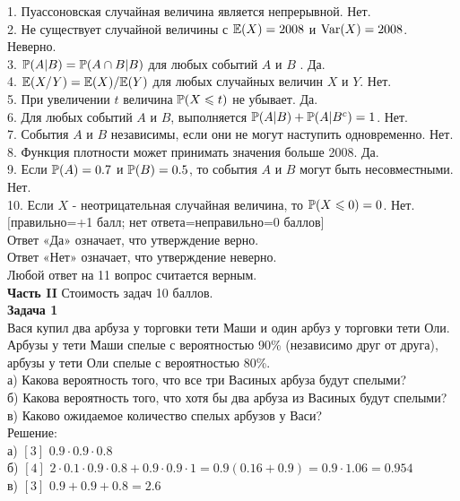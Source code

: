 \documentclass[12pt, a4paper]{article}\usepackage[]{graphicx}\usepackage[]{color}
\begin{document}
	1. Пуассоновская случайная величина является непрерывной. Нет. \\
	2. Не существует случайной величины с $\E(X)=2008$ и $\Var(X)=2008$. Неверно. \\
	3. $\P(A|B)=\P(A\cap B|B)$ для любых событий $A$ и $B$ . Да. \\
	4. $\E(X/Y)=\E(X)/\E(Y)$ для любых случайных величин $X$ и $Y$. Нет. \\
	5. При увеличении $t$ величина $\P(X\le t)$ не убывает. Да. \\
	6. Для любых событий $A$ и $B$, выполняется $\P(A|B)+\P(A|B^{c})=1$. Нет. \\
	7. События $A$ и $B$ независимы, если они не могут наступить одновременно. Нет. \\
	8. Функция плотности может принимать значения больше 2008. Да. \\
	9. Если $\P(A)=0.7$ и $\P(B)=0.5$, то события $A$ и $B$ могут быть несовместными. Нет. \\
	10. Если $X$ - неотрицательная случайная величина, то $\P(X\le 0)=0$. Нет. \\

	$[$правильно=+1 балл; нет ответа=неправильно=0 баллов$]$ \\
	Ответ «Да» означает, что утверждение верно. \\
	Ответ «Нет» означает, что утверждение неверно. \\
	Любой ответ на 11 вопрос считается верным. \\


	\textbf{Часть II} Стоимость задач 10 баллов. \\





	\textbf{Задача 1} \\ %
	Вася купил два арбуза у торговки тети Маши и один арбуз у торговки тети Оли. Арбузы у тети Маши спелые с вероятностью 90\% (независимо друг от друга), арбузы у тети Оли спелые с вероятностью 80\%. \\
	а) Какова вероятность того, что все три Васиных арбуза будут спелыми? \\
	б) Какова вероятность того, что хотя бы два арбуза из Васиных будут спелыми? \\
	в) Каково ожидаемое количество спелых арбузов у Васи? \\
	Решение: \\
	а) $[3]$ $0.9\cdot 0.9\cdot 0.8$ \\
	б) $[4]$ $2\cdot 0.1\cdot 0.9\cdot 0.8+0.9\cdot 0.9\cdot 1=0.9(0.16+0.9)=0.9\cdot 1.06=0.954$ \\
	в) $[3]$ $0.9+0.9+0.8=2.6$ \\
\end{document}
